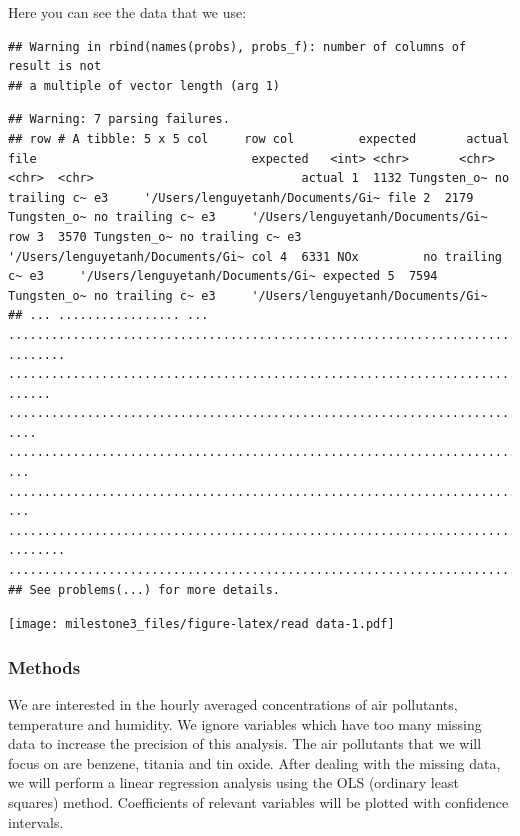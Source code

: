 \documentclass[]{article}
\begin{document}
Here you can see the data that we use:

\begin{verbatim}
## Warning in rbind(names(probs), probs_f): number of columns of result is not
## a multiple of vector length (arg 1)
\end{verbatim}

\begin{verbatim}
## Warning: 7 parsing failures.
## row # A tibble: 5 x 5 col     row col         expected       actual file                              expected   <int> <chr>       <chr>          <chr>  <chr>                             actual 1  1132 Tungsten_o~ no trailing c~ e3     '/Users/lenguyetanh/Documents/Gi~ file 2  2179 Tungsten_o~ no trailing c~ e3     '/Users/lenguyetanh/Documents/Gi~ row 3  3570 Tungsten_o~ no trailing c~ e3     '/Users/lenguyetanh/Documents/Gi~ col 4  6331 NOx         no trailing c~ e3     '/Users/lenguyetanh/Documents/Gi~ expected 5  7594 Tungsten_o~ no trailing c~ e3     '/Users/lenguyetanh/Documents/Gi~
## ... ................. ... ........................................................................... ........ ........................................................................... ...... ........................................................................... .... ........................................................................... ... ........................................................................... ... ........................................................................... ........ ...........................................................................
## See problems(...) for more details.
\end{verbatim}

\texttt{[image: milestone3\_files/figure-latex/read data-1.pdf]}

\hypertarget{methods}{%
\subsubsection{Methods}\label{methods}}

We are interested in the hourly averaged concentrations of air
pollutants, temperature and humidity. We ignore variables which have too
many missing data to increase the precision of this analysis. The air
pollutants that we will focus on are benzene, titania and tin oxide.
After dealing with the missing data, we will perform a linear regression
analysis using the OLS (ordinary least squares) method. Coefficients of
relevant variables will be plotted with confidence intervals.
\end{document}
